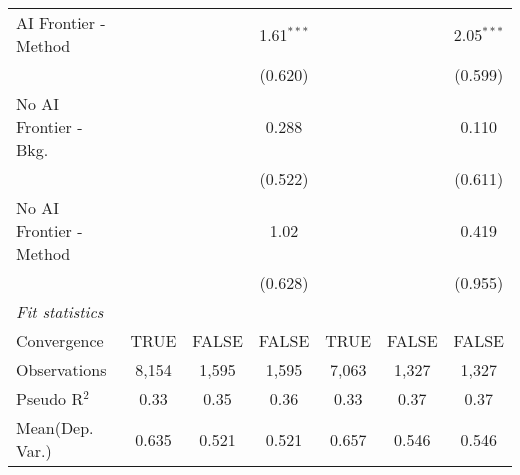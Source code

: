 \begin{tabular}{lcccccc}
   AI Frontier - Method    &               &              & 1.61$^{***}$ &               &              & 2.05$^{***}$\\   
                           &               &              & (0.620)      &               &              & (0.599)\\   
   No AI Frontier - Bkg.   &               &              & 0.288        &               &              & 0.110\\   
                           &               &              & (0.522)      &               &              & (0.611)\\   
   No AI Frontier - Method &               &              & 1.02         &               &              & 0.419\\   
                           &               &              & (0.628)      &               &              & (0.955)\\   
   \midrule
   \emph{Fit statistics}\\
   Convergence             &TRUE           & FALSE        & FALSE        & TRUE          & FALSE        & FALSE\\  
   Observations            & 8,154         & 1,595        & 1,595        & 7,063         & 1,327        & 1,327\\  
   Pseudo R$^2$            & 0.33          & 0.35         & 0.36         & 0.33          & 0.37         & 0.37\\  
Mean(Dep. Var.) & 0.635 & 0.521 & 0.521 & 0.657 & 0.546 & 0.546 \\
   

\end{tabular}
